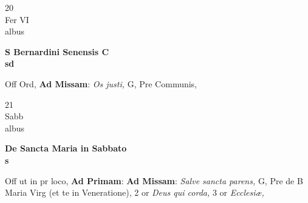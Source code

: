 \documentclass[10pt, openany]{book}
\begin{document}
        \begin{center}
            \begin{minipage}{3.5in}
                \vspace{2em}
                \begin{minipage}{0.5in}
                    {\Huge 20} \\
                    {\normalsize Fer VI} \\
                    {\normalsize albus}
                \end{minipage}
                \begin{minipage}{3.0in}
                    \textbf{ \large S Bernardini Senensis C \\
                    \textnormal{\normalsize sd}} \\ 
                \end{minipage}
                \begin{justify}Off Ord, \textbf{Ad Missam}: \textit{Os justi,} G, Pre Communis,  
                \end{justify}
            \end{minipage}
        \end{center}
    
        \begin{center}
            \begin{minipage}{3.5in}
                \vspace{2em}
                \begin{minipage}{0.5in}
                    {\Huge 21} \\
                    {\normalsize Sabb} \\
                    {\normalsize albus}
                \end{minipage}
                \begin{minipage}{3.0in}
                    \textbf{ \large De Sancta Maria in Sabbato \\
                    \textnormal{\normalsize s}} \\ 
                \end{minipage}
                \begin{justify}Off ut in pr loco, \textbf{Ad Primam}: \textbf{Ad Missam}: \textit{Salve sancta parens,} G, Pre de B Maria Virg (et te in Veneratione), 2 or \textit{Deus qui corda,} 3 or \textit{Ecclesiæ,}  
                \end{justify}
            \end{minipage}
        \end{center}
    
\end{document}
